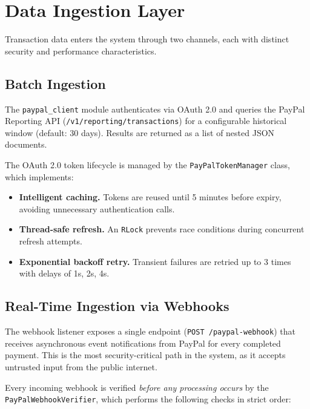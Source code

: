 \documentclass[11pt,a4paper]{article}
\begin{document}
\section{Data Ingestion Layer}
\label{sec:data-ingestion}

Transaction data enters the system through two channels, each with distinct security and performance characteristics.

\subsection{Batch Ingestion}

The \texttt{paypal\_client} module authenticates via OAuth 2.0 and queries the PayPal Reporting API (\texttt{/v1/reporting/transactions}) for a configurable historical window (default: 30 days). Results are returned as a list of nested JSON documents.

The OAuth 2.0 token lifecycle is managed by the \texttt{PayPalTokenManager} class, which implements:

\begin{itemize}[leftmargin=*]
  \item \textbf{Intelligent caching.} Tokens are reused until 5 minutes before expiry, avoiding unnecessary authentication calls.
  \item \textbf{Thread-safe refresh.} An \texttt{RLock} prevents race conditions during concurrent refresh attempts.
  \item \textbf{Exponential backoff retry.} Transient failures are retried up to 3 times with delays of 1s, 2s, 4s.
\end{itemize}

\subsection{Real-Time Ingestion via Webhooks}

The webhook listener exposes a single endpoint (\texttt{POST /paypal-webhook}) that receives asynchronous event notifications from PayPal for every completed payment. This is the most security-critical path in the system, as it accepts untrusted input from the public internet.

Every incoming webhook is verified \emph{before any processing occurs} by the \texttt{PayPalWebhookVerifier}, which performs the following checks in strict order:
\end{document}
